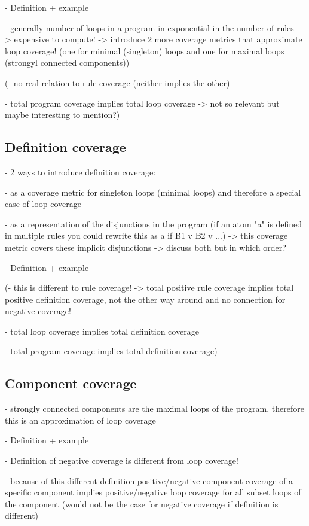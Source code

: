 - Definition + example

- generally number of loops in a program in exponential in the number of rules -> expensive to compute! -> introduce 2 more 
coverage metrics that approximate loop coverage! (one for minimal (singleton) loops and one for maximal loops (strongyl connected 
components))

(- no real relation to rule coverage (neither implies the other)

- total program coverage implies total loop coverage -> not so relevant but maybe interesting to mention?)

\subsection{Definition coverage}
\label{subsec:Coverage metrics/Branch-like coverage/Definition coverage}
- 2 ways to introduce definition coverage: 
    
    - as a coverage metric for singleton loops (minimal loops) and therefore a special case of loop coverage

    - as a representation of the disjunctions in the program (if an atom "a" is defined in multiple rules you could rewrite 
    this as a if B1 v B2 v ...) -> this coverage metric covers these implicit disjunctions
-> discuss both but in which order?

- Definition + example

(- this is different to rule coverage! -> total positive rule coverage implies total positive definition coverage, not the other 
way around and no connection for negative coverage!

- total loop coverage implies total definition coverage

- total program coverage implies total definition coverage)

\subsection{Component coverage}
\label{subsec:Coverage cetrics/Branch-like coverage/Component coverage}
- strongly connected components are the maximal loops of the program, therefore this is an approximation of loop coverage

- Definition + example

- Definition of negative coverage is different from loop coverage!

- because of this different definition positive/negative component coverage of a specific component implies positive/negative loop 
coverage for all subset loops of the component (would not be the case for negative coverage if definition is different)

